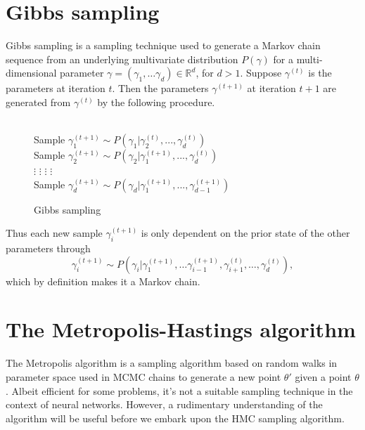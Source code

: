 \section{Gibbs sampling}
Gibbs sampling \cite{gibbs} is a sampling technique used to generate a Markov chain sequence from an underlying multivariate distribution $P(\gamma)$ for a multi-dimensional parameter $\gamma = (\gamma_1, \ldots \gamma_d) \in \mathbb{R}^d$, for $d > 1$.
Suppose $\gamma^{(t)}$ is the parameters at iteration $t$. Then the parameters $\gamma^{(t+1)}$ at iteration $t+1$ are generated from $\gamma^{(t)}$ by the following procedure.
\begin{figure}[H]
  \begin{algorithm}[H]
    \caption{Gibbs sampling}
    \begin{algorithmic}
      \\
        \State Sample $\gamma^{(t+1)}_1 \sim P(\gamma_1|\gamma_2^{(t)},...,\gamma_d^{(t)})$ \\
        \State Sample $\gamma^{(t+1)}_2 \sim P(\gamma_2|\gamma_1^{(t+1)},...,\gamma_d^{(t)})$\\
        \State $\vdots$ \qquad  \qquad $\vdots$ \qquad  \qquad $\vdots$ \qquad \qquad $\vdots$\\
        \State Sample $\gamma^{(t+1)}_d \sim P(\gamma_d|\gamma_1^{(t+1)},...,\gamma_{d-1}^{(t+1)})$\\
      \EndProcedure
    \end{algorithmic}
  \end{algorithm}
\end{figure}
\noindent Thus each new sample $\gamma^{(t+1)}_i$ is only dependent on the prior state of the other parameters through
\begin{equation}
  \gamma_i^{(t+1)} \sim P(\gamma_i|\gamma_{1}^{(t+1)}, \ldots \gamma_{i-1}^{(t+1)}, \gamma_{i+1}^{(t)}, \ldots, \gamma_{d}^{(t)}),
\end{equation}
which by definition makes it a Markov chain.


\section{The Metropolis-Hastings algorithm}
The Metropolis algorithm \cite{metropolis} is a sampling algorithm based on random walks in parameter space used in MCMC chains to generate a new point $\theta'$ given a point $\theta$. Albeit efficient for some
problems, it's not a suitable sampling technique in the context of neural networks. However, a rudimentary understanding of the algorithm will be useful before we embark upon the HMC sampling algorithm. 

